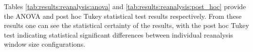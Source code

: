 \begin{table}[htbp]
\end{table}%

Tables \ref{tab:results:reanalysis:anova} and \ref{tab:results:reanalysis:post_hoc} provide the ANOVA and post hoc Tukey statistical test results respectively. From these results one can see the statistical certainty of the results, with the post hoc Tukey test indicating statistical significant differences between individual reanalysis window size configurations.

\begin{table}[htbp]
	\centering
	\caption{ANOVA - Rank - BHH Variant: Reanalysis}
	\label{tab:results:reanalysis:anova}%
	\par\bigskip
\end{table}


